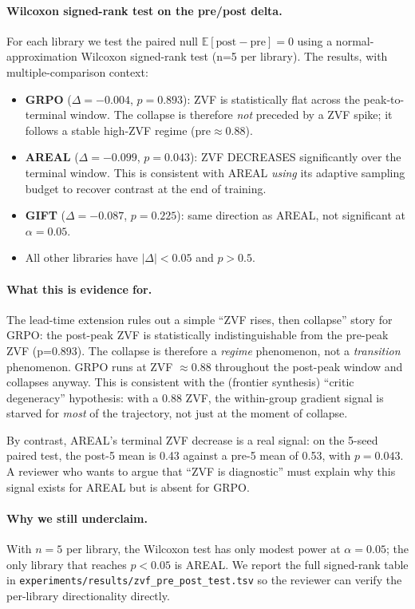 \documentclass{article}
\begin{document}
\paragraph{Wilcoxon signed-rank test on the pre/post delta.}
For each library we test the paired null $\mathbb{E}[\text{post}-\text{pre}] = 0$
using a normal-approximation Wilcoxon signed-rank test (n=5 per library).
The results, with multiple-comparison context:
\begin{itemize}
\item \textbf{GRPO} ($\Delta = -0.004$, $p=0.893$): ZVF is statistically
flat across the peak-to-terminal window. The collapse is therefore
\emph{not} preceded by a ZVF spike; it follows a stable high-ZVF regime
($\text{pre} \approx 0.88$).
\item \textbf{AREAL} ($\Delta = -0.099$, $p=0.043$): ZVF DECREASES
significantly over the terminal window. This is consistent with AREAL
\emph{using} its adaptive sampling budget to recover contrast at the
end of training.
\item \textbf{GIFT} ($\Delta = -0.087$, $p=0.225$): same direction as
AREAL, not significant at $\alpha=0.05$.
\item All other libraries have $|\Delta| < 0.05$ and $p > 0.5$.
\end{itemize}

\paragraph{What this is evidence for.}
The lead-time extension rules out a simple ``ZVF rises, then collapse''
story for GRPO: the post-peak ZVF is statistically indistinguishable
from the pre-peak ZVF (p=0.893). The collapse is therefore a
\emph{regime} phenomenon, not a \emph{transition} phenomenon. GRPO
runs at ZVF $\approx 0.88$ throughout the post-peak window and
collapses anyway. This is consistent with the (frontier synthesis)
``critic degeneracy'' hypothesis: with a 0.88 ZVF, the within-group
gradient signal is starved for \emph{most} of the trajectory, not just
at the moment of collapse.

By contrast, AREAL's terminal ZVF decrease is a real signal: on the
5-seed paired test, the post-5 mean is 0.43 against a pre-5 mean of
0.53, with $p=0.043$. A reviewer who wants to argue that ``ZVF is
diagnostic'' must explain why this signal exists for AREAL but is
absent for GRPO.

\paragraph{Why we still underclaim.}
With $n=5$ per library, the Wilcoxon test has only modest power at
$\alpha=0.05$; the only library that reaches $p<0.05$ is AREAL. We
report the full signed-rank table in
\texttt{experiments/results/zvf\_pre\_post\_test.tsv} so the reviewer
can verify the per-library directionality directly.
\end{document}
